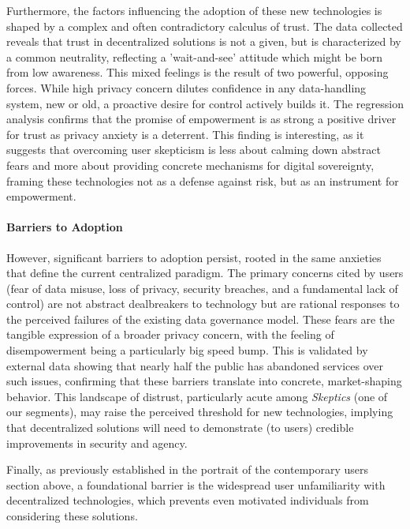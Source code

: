 	Furthermore, the factors influencing the adoption of these new technologies is shaped by a complex and often contradictory calculus of trust. The data collected reveals that trust in decentralized solutions is not a given, but is characterized by a common neutrality, reflecting a 'wait-and-see' attitude which might be born from low awareness. This mixed feelings is the result of two powerful, opposing forces. While high privacy concern dilutes confidence in any data-handling system, new or old, a proactive desire for control actively builds it. The regression analysis confirms that the promise of empowerment is as strong a positive driver for trust as privacy anxiety is a deterrent. This finding is interesting, as it suggests that overcoming user skepticism is less about calming down abstract fears and more about providing concrete mechanisms for digital sovereignty, framing these technologies not as a defense against risk, but as an instrument for empowerment.

	\paragraph{Barriers to Adoption}
	However, significant barriers to adoption persist, rooted in the same anxieties that define the current centralized paradigm. The primary concerns cited by users (fear of data misuse, loss of privacy, security breaches, and a fundamental lack of control) are not abstract dealbreakers to technology but are rational responses to the perceived failures of the existing data governance model. These fears are the tangible expression of a broader privacy concern, with the feeling of disempowerment being a particularly big speed bump. This is validated by external data showing that nearly half the public has abandoned services over such issues, confirming that these barriers translate into concrete, market-shaping behavior. This landscape of distrust, particularly acute among \textit{Skeptics} (one of our segments), may raise the perceived threshold for new technologies, implying that decentralized solutions will need to demonstrate (to users) credible improvements in security and agency.

	Finally, as previously established in the portrait of the contemporary users section above, a foundational barrier is the widespread user unfamiliarity with decentralized technologies, which prevents even motivated individuals from considering these solutions.
